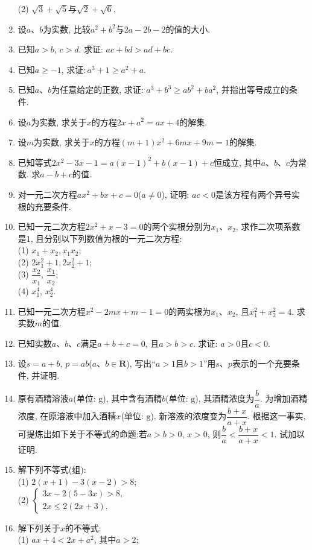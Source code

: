 \documentclass[10pt,a4paper]{article}
\begin{document}
\begin{enumerate}[1.]
(2) $\sqrt 3+\sqrt 5$与$\sqrt 2+\sqrt 6$.
\item 设$a$、$b$为实数, 比较$a^2+b^2$与$2a-2b-2$的值的大小.
\item 已知$a>b$, $c>d$. 求证: $ac+bd>ad+bc$.
\item 已知$a\ge -1$, 求证$: a^3+1\ge a^2+a$.
\item 已知$a$、$b$为任意给定的正数, 求证: $a^3+b^3\ge ab^2+ba^2$, 并指出等号成立的条件.
\item 设$a$为实数, 求关于$x$的方程$2x+a^2=ax+4$的解集.
\item 设$m$为实数, 求关于$x$的方程$(m+1)x^2+6mx+9m=1$的解集.
\item 已知等式$2x^2-3x-1=a(x-1)^2+b(x-1)+c$恒成立, 其中$a$、$b$、$c$为常数. 求$a-b+c$的值.
\item 对一元二次方程$ax^2+bx+c=0$($a\ne 0$), 证明: $ac<0$是该方程有两个异号实根的充要条件.
\item 已知一元二次方程$2x^2+x-3=0$的两个实根分别为$x_1$、$x_2$, 求作二次项系数是$1$, 且分别以下列数值为根的一元二次方程:\\
(1) $x_1+x_2, x_1x_2$;\\
(2) $2x_1^2+1, 2x_2^2+1$;\\
(3) $\dfrac{x_2}{x_1}$, $\dfrac{x_1}{x_2}$;\\
(4) $x_1^4$, $x_2^4$.
\item 已知一元二次方程$x^2-2mx+m-1=0$的两实根为$x_1$、$x_2$, 且$x_1^2+x_2^2=4$. 求实数$m$的值.
\item 已知实数$a$、$b$、$c$满足$a+b+c=0$, 且$a>b>c$. 求证: $a>0$且$c<0$.
\item 设$s=a+b$, $p=ab$($a$、$b\in\mathbf{R}$), 写出``$a>1$且$b>1$''用$s$、$p$表示的一个充要条件, 并证明.
\item 原有酒精溶液$a$(单位: $\text{g}$), 其中含有酒精$b$(单位: $\text{g}$), 其酒精浓度为$\dfrac ba$. 为增加酒精浓度, 在原溶液中加入酒精$x$(单位: $\text{g}$), 新溶液的浓度变为$\dfrac{b+x}{a+x}$. 根据这一事实, 可提炼出如下关于不等式的命题:若$a>b>0$, $x>0$, 则$\dfrac ba<\dfrac{b+x}{a+x}<1$. 试加以证明. 
\item 解下列不等式(组):\\
(1) $2(x+1)-3(x-2)>8$;\\
(2) $\begin{cases} 3x-2(5-3x)>8,\\ 2x\le 2(2x+3). \end{cases}$
\item 解下列关于$x$的不等式:\\
(1) $ax+4<2x+a^2$, 其中$a>2$;\\

\end{enumerate}
\end{document}
